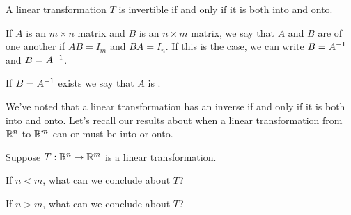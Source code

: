 {} A linear transformation $T$ is invertible if and only if it is both into and
onto.  

{}   
If $A$ is an $m\times n$ matrix and $B$ is an $n\times m$ matrix, we say that 
$A$ and $B$ are {} of one another if $AB = I_m$ and $BA = I_n$. If this is the case, we can write $B = A^{-1}$ and $B = A^{-1}$.  

If $B = A^{-1}$ exists we say that $A$ is {}.  



\endedxtext




\endedxvertical










We've noted that a linear transformation has an inverse if and only if it is both into and onto.  
Let's recall our results about when a linear transformation from $\mathbb R^n$ to $\mathbb R^m$ can or must
be into or onto.  

Suppose $T: \mathbb R^n \rightarrow \mathbb R^m$ is a linear transformation.


If $n<m$, what can we conclude about $T$?  




If $n>m$, what can we conclude about $T$?  








